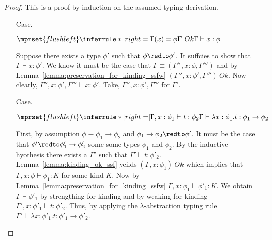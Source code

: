 \begin{proof}
  This is a proof by induction on the assumed typing derivation.

\begin{itemize}
\item[Case.]\ \\
  \begin{center}
    \begin{math}
      $$\mprset{flushleft}
      \inferrule* [right=] {
        \Gamma(x) = \phi
        \\
        \Gamma\ Ok
      }{\Gamma \vdash x : \phi}
    \end{math}  
  \end{center}
  Suppose there exists a type $\phi'$ such that $\phi \redto \phi'$.  It suffcies to show that
  $\Gamma \vdash x:\phi'$.  We know it must be the case that $\Gamma \equiv (\Gamma'',x:\phi,\Gamma''')$
  and by Lemma~\ref{lemma:preservation_for_kinding_ssfw} $(\Gamma'',x:\phi',\Gamma''')\ Ok$.  Now clearly,
  $\Gamma'',x:\phi',\Gamma''' \vdash x:\phi'$.  Take, $\Gamma'',x:\phi',\Gamma'''$ for $\Gamma'$. 

\item[Case.]\ \\
  \begin{center}
    \begin{math}
      $$\mprset{flushleft}
      \inferrule* [right=] {
        \Gamma,x : \phi_1 \vdash t : \phi_2
      }{\Gamma \vdash \lambda x : \phi_1.t : \phi_1 \rightarrow \phi_2}
    \end{math} 
  \end{center}
  First, by assumption $\phi \equiv \phi_1 \to \phi_2$ and $\phi_1 \to
  \phi_2 \redto \phi'$.  It must be the case that $\phi' \redto
  \phi'_1 \to \phi'_2$ some some types $\phi_1$ and $\phi_2$.  By the
  inductive hyothesis there exists a $\Gamma'$ such that $\Gamma'
  \vdash t:\phi'_2$. Lemma~\ref{lemma:kinding_ok_ssf} yeilds $(\Gamma,x:\phi_1)\ Ok$ which
  implies that $\Gamma,x:\phi \vdash \phi_1:K$ for some kind $K$.  Now
  by Lemma~\ref{lemma:preservation_for_kinding_ssfw} $\Gamma,x:\phi_1 \vdash
  \phi'_1:K$.  We obtain $\Gamma \vdash \phi'_1$ by strengthing for
  kinding and by weaking for kinding $\Gamma',x:\phi'_1 \vdash
  t:\phi'_2$.  Thus, by applying the $\lambda$-abstraction typing rule
  $\Gamma' \vdash \lambda x:\phi'_1.t:\phi'_1 \to \phi'_2$.


\end{itemize}
\end{proof}
